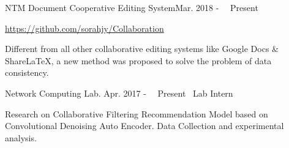 \documentclass{sorahjy_cv}
\begin{document}
\begin{sectionContentSimple}{NTM Document Cooperative Editing System}{Mar. 2018 - \ \ Present \ }
	\item \url{https://github.com/sorahjy/Collaboration}
	\item Different from all other collaborative editing systems like Google Docs \& ShareLaTeX, a new method was proposed to solve the problem of data consistency.
\end{sectionContentSimple}


\begin{sectionContentNormal}{Network Computing Lab. }{Apr. 2017 - \ \ Present \ }{Lab Intern \ \ }
	\item Research on Collaborative Filtering Recommendation Model based on Convolutional Denoising Auto Encoder. Data Collection and experimental analysis.
\end{sectionContentNormal}

%
%









\end{document}
